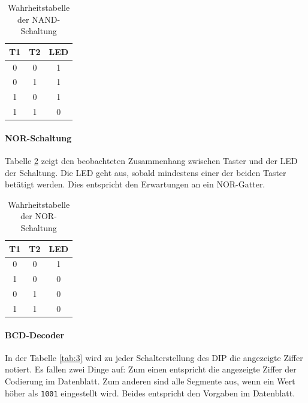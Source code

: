 \documentclass[
    paper=a4,
]{scrartcl}
\begin{document}
    \begin{table}[h]
        \centering
        \caption{Wahrheitstabelle der NAND-Schaltung}
        \label{tab:1}
        \begin{tabular}{cc|c}\toprule
            T1  &   T2  &   LED\\\midrule
            0   &   0   &   1\\
            0   &   1   &   1\\
            1   &   0   &   1\\
            1   &   1   &   0\\\bottomrule
        \end{tabular}
    \end{table}

    \paragraph{NOR-Schaltung} Tabelle \ref{tab:2} zeigt den beobachteten Zusammenhang zwischen Taster und der LED der Schaltung. Die LED geht aus, sobald mindestens einer der beiden Taster betätigt werden. Dies entspricht den Erwartungen an ein NOR-Gatter.

    \begin{table}[h]
        \centering
        \caption{Wahrheitstabelle der NOR-Schaltung}
        \label{tab:2}
        \begin{tabular}{cc|c}\toprule
            T1  &   T2  &   LED\\\midrule
            0   &   0   &   1\\
            1   &   0   &   0\\
            0   &   1   &   0\\
            1   &   1   &   0\\\bottomrule
        \end{tabular}
    \end{table}

    \paragraph{BCD-Decoder} In der Tabelle \ref{tab:3} wird zu jeder Schalterstellung des DIP die angezeigte Ziffer notiert. Es fallen zwei Dinge auf: Zum einen entspricht die angezeigte Ziffer der Codierung im Datenblatt. Zum anderen sind alle Segmente aus, wenn ein Wert höher als \texttt{1001} eingestellt wird. Beides entspricht den Vorgaben im Datenblatt.
    
\end{document}
